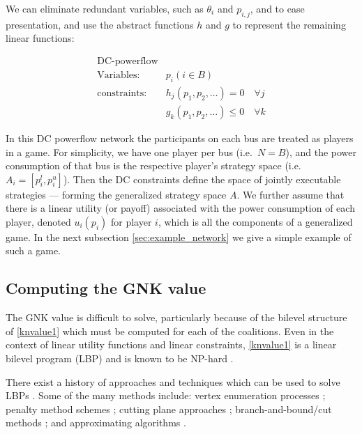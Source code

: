 We can eliminate redundant variables, such as $\theta_i$ and $p_{i,j}$, and to ease presentation, and use the abstract functions $h$ and $g$ to represent the remaining linear functions:

\begin{equation}
\label{dcopf2}
\begin{aligned}
\text{DC-powerflow}\\
\text{Variables:}\quad & p_i (i\in B) \\
\text{constraints:}\quad & h_j(p_1,p_2,\dots)=0\quad \forall j\\
& g_k(p_1,p_2,\dots)\le 0 \quad \forall k
\end{aligned}
\end{equation}

In this DC powerflow network the participants on each bus are treated as players in a game.
For simplicity, we have one player per bus (i.e.~$N=B$), and the power consumption of that bus is the respective player's strategy space (i.e.\ $A_i=[p_i^l,p_i^u]$).
Then the DC constraints define the space of jointly executable strategies --- forming the generalized strategy space $A$. 
We further assume that there is a linear utility (or payoff) associated with the power consumption of each player, denoted $u_i(p_i)$ for player $i$,
which is all the components of a generalized game.
In the next subsection \ref{sec:example_network} we give a simple example of such a game.



\subsection{Computing the GNK value}
The GNK value is difficult to solve, particularly because of the bilevel structure of \eqref{knvalue1} which must be computed for each of the coalitions.
Even in the context of linear utility functions and linear constraints, \eqref{knvalue1} is a linear bilevel program (LBP) and is known to be  NP-hard \cite{DBLP:journals/tec/SinhaMD18,Ben-Ayed:1990:CDB}.

There exist a history of approaches and techniques which can be used to solve LBPs \cite{DBLP:journals/tec/SinhaMD18,S.Dempe.Optimisations}.
Some of the many methods include: vertex enumeration processes \cite{Bialas:1984:TLP:2784019.2784026,Shi:2005:EKA:2641854.2642183,LIU1995644,article_cutting_plane}; penalty method schemes \cite{KleinertSchmidt2019,ONAL1993126,dempe_optimisation111};
cutting plane approaches \cite{cuttingplane1};
branch-and-bound/cut methods \cite{SHI200551,Hansen:1992:NBR:141164.141181,Audet2007};
and approximating algorithms \cite{Pineda2018,rnnlbp1,genetic_algirthm_blp}.

